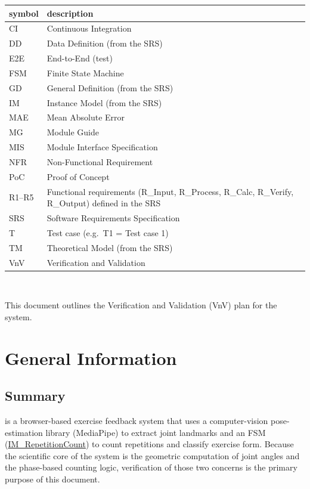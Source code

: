 \documentclass[12pt, titlepage]{article}
\begin{document}
\renewcommand{\arraystretch}{1.2}
\begin{tabular}{l l}
  \toprule
  \textbf{symbol} & \textbf{description}\\
  \midrule
  CI    & Continuous Integration\\
  DD    & Data Definition (from the SRS)\\
  E2E   & End-to-End (test)\\
  FSM   & Finite State Machine\\
  GD    & General Definition (from the SRS)\\
  IM    & Instance Model (from the SRS)\\
  MAE   & Mean Absolute Error\\
  MG    & Module Guide\\
  MIS   & Module Interface Specification\\
  NFR   & Non-Functional Requirement\\
  PoC   & Proof of Concept\\
  R1--R5 & Functional requirements (R\_Input, R\_Process, R\_Calc, R\_Verify, R\_Output) defined in the SRS\\
  SRS   & Software Requirements Specification\\
  T     & Test case (e.g.\ T1 = Test case 1)\\
  TM    & Theoretical Model (from the SRS)\\
  VnV   & Verification and Validation\\
  \bottomrule
\end{tabular}\\

\newpage


This document outlines the Verification and Validation (VnV) plan for the \progname{} system.

\section{General Information}

\subsection{Summary}
\progname{} is a browser-based exercise feedback system that uses a
computer-vision pose-estimation library (MediaPipe) to extract joint
landmarks and an FSM (\hyperref[IM_RepetitionCount]{IM\_RepetitionCount})
to count repetitions and classify exercise form. Because the scientific
core of the system is the geometric computation of joint angles and the
phase-based counting logic, verification of those two concerns is the
primary purpose of this document.
\end{document}
